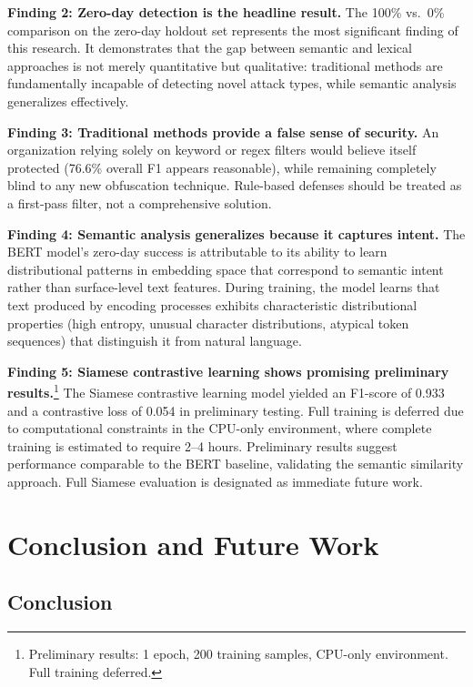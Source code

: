 \documentclass[11pt]{article}
\begin{document}
\textbf{Finding 2: Zero-day detection is the headline result.} The 100\% vs.\ 0\% comparison on the zero-day holdout set represents the most significant finding of this research. It demonstrates that the gap between semantic and lexical approaches is not merely quantitative but qualitative: traditional methods are fundamentally incapable of detecting novel attack types, while semantic analysis generalizes effectively.

\textbf{Finding 3: Traditional methods provide a false sense of security.} An organization relying solely on keyword or regex filters would believe itself protected (76.6\% overall F1 appears reasonable), while remaining completely blind to any new obfuscation technique. Rule-based defenses should be treated as a first-pass filter, not a comprehensive solution.

\textbf{Finding 4: Semantic analysis generalizes because it captures intent.} The BERT model's zero-day success is attributable to its ability to learn distributional patterns in embedding space that correspond to semantic intent rather than surface-level text features. During training, the model learns that text produced by encoding processes exhibits characteristic distributional properties (high entropy, unusual character distributions, atypical token sequences) that distinguish it from natural language.

\textbf{Finding 5: Siamese contrastive learning shows promising preliminary results.}\footnote{Preliminary results: 1 epoch, 200 training samples, CPU-only environment. Full training deferred.} The Siamese contrastive learning model yielded an F1-score of 0.933 and a contrastive loss of 0.054 in preliminary testing. Full training is deferred due to computational constraints in the CPU-only environment, where complete training is estimated to require 2--4 hours. Preliminary results suggest performance comparable to the BERT baseline, validating the semantic similarity approach. Full Siamese evaluation is designated as immediate future work.

\section{Conclusion and Future Work}
\label{sec:conclusion}

\subsection{Conclusion}
\end{document}
